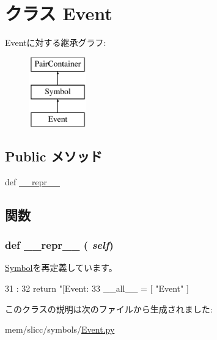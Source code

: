 \hypertarget{classslicc_1_1symbols_1_1Event_1_1Event}{
\section{クラス Event}
\label{classslicc_1_1symbols_1_1Event_1_1Event}
}
Eventに対する継承グラフ:\begin{figure}[H]
\begin{center}
\leavevmode
\includegraphics[height=3cm]{classslicc_1_1symbols_1_1Event_1_1Event}
\end{center}
\end{figure}
\subsection*{Public メソッド}
\begin{DoxyCompactItemize}
\item 
def \hyperlink{classslicc_1_1symbols_1_1Event_1_1Event_ad8b9328939df072e4740cd9a63189744}{\_\-\_\-repr\_\-\_\-}
\end{DoxyCompactItemize}


\subsection{関数}
\hypertarget{classslicc_1_1symbols_1_1Event_1_1Event_ad8b9328939df072e4740cd9a63189744}{
\subsubsection[{\_\-\_\-repr\_\-\_\-}]{\setlength{\rightskip}{0pt plus 5cm}def \_\-\_\-repr\_\-\_\- ( {\em self})}}
\label{classslicc_1_1symbols_1_1Event_1_1Event_ad8b9328939df072e4740cd9a63189744}


\hyperlink{classslicc_1_1symbols_1_1Symbol_1_1Symbol_ad8b9328939df072e4740cd9a63189744}{Symbol}を再定義しています。


\begin{DoxyCode}
31                       :
32         return "[Event: %
33 
__all__ = [ "Event" ]
\end{DoxyCode}


このクラスの説明は次のファイルから生成されました:\begin{DoxyCompactItemize}
\item 
mem/slicc/symbols/\hyperlink{Event_8py}{Event.py}\end{DoxyCompactItemize}
